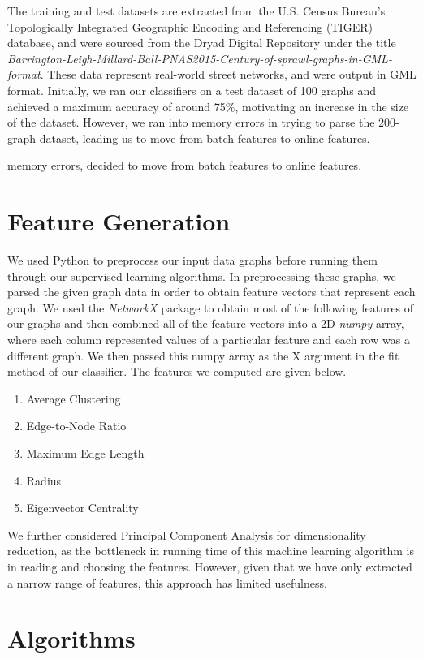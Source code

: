 \documentclass{article}
\begin{document}
The training and test datasets are extracted from the U.S. Census Bureau's Topologically Integrated Geographic Encoding and Referencing (TIGER) database, and were sourced from the Dryad Digital Repository under the title \textit{Barrington-Leigh-Millard-Ball-PNAS2015-Century-of-sprawl-graphs-in-GML-format}. These data represent real-world street networks, and were output in GML format. Initially, we ran our classifiers on a test dataset of 100 graphs and achieved a maximum accuracy of around 75$\%$, motivating an increase in the size of the dataset. However, we ran into memory errors in trying to parse the 200-graph dataset, leading us to move from batch features to online features.

memory errors, decided to move from batch features to online features. 

\section{Feature Generation}

We used Python to preprocess our input data graphs before running them through our supervised learning algorithms. In preprocessing these graphs, we parsed the given graph data in order to obtain feature vectors that represent each graph. We used the \textit{NetworkX} package to obtain most of the following features of our graphs and then combined all of the feature vectors into a 2D \textit{numpy} array, where each column represented values of a particular feature and each row was a different graph. We then passed this numpy array as the X argument in the fit method of our classifier. The features we computed are given below.

\begin{enumerate}
\item Average Clustering
\item Edge-to-Node Ratio
\item Maximum Edge Length
\item Radius
\item Eigenvector Centrality
\end{enumerate}

We further considered Principal Component Analysis for dimensionality reduction, as the bottleneck in running time of this machine learning algorithm is in reading and choosing the features. However, given that we have only extracted a narrow range of features, this approach has limited usefulness.

\section{Algorithms}
\end{document}
